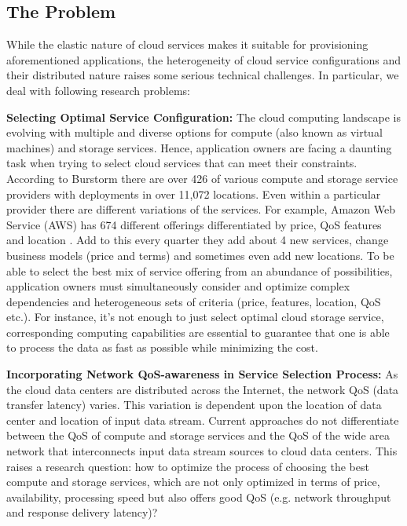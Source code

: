 \documentclass[journal]{IEEEtran}
\begin{document}
\subsection{The Problem}
While the elastic nature of cloud services makes it suitable for provisioning aforementioned applications, the heterogeneity of cloud service configurations and their distributed nature raises some serious technical challenges. In particular, we deal with following research problems:

\textbf{Selecting Optimal Service Configuration: }The cloud computing landscape is evolving with multiple and diverse options for compute (also known as virtual machines) and storage services. Hence, application owners are facing a daunting task when trying to select cloud services that can meet their constraints. According to Burstorm \cite{ref18} there are over 426 of various compute and storage service providers with deployments in over 11,072 locations. Even within a particular provider there are different variations of the services. For example, Amazon Web Service (AWS) has 674 different offerings differentiated by price, QoS features and location \cite{ref1}. Add to this every quarter they add about 4 new services, change business models (price and terms) and sometimes even add new locations. To be able to select the best mix of service offering from an abundance of possibilities, application owners must simultaneously consider and optimize complex dependencies and heterogeneous sets of criteria (price, features, location, QoS etc.). For instance, it's not enough to just select optimal cloud storage service, corresponding computing capabilities are essential to guarantee that one is able to process the data as fast as possible while minimizing the cost.

\textbf{Incorporating Network QoS-awareness in Service Selection Process: }As the cloud data centers are distributed across the Internet, the network QoS (data transfer latency) varies. This variation is dependent upon the location of data center and location of input data stream. Current approaches do not differentiate between the QoS of compute and storage services and the QoS of the wide area network that interconnects input data stream sources to cloud data centers. This raises a research question: how to optimize the process of choosing the best compute and storage services, which are not only optimized in terms of price, availability, processing speed but also offers good QoS (e.g. network throughput and response delivery latency)?
\end{document}
